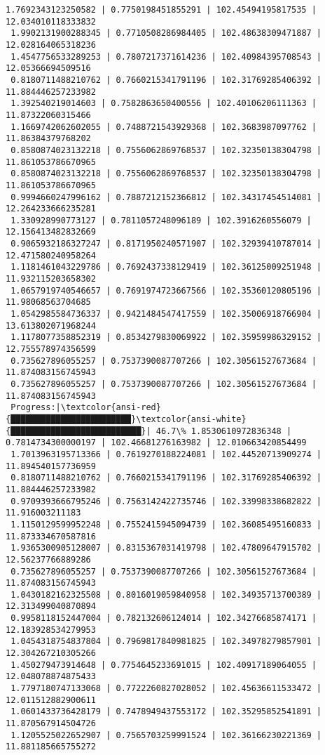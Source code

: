 \documentclass[11pt]{article}
\begin{document}
\begin{Verbatim}[commandchars=\\\{\}]
 1.7692343123250582 | 0.7750198451855291 | 102.45494195817535 | 12.034010118333832
 1.9902131900288345 | 0.7710508286984405 | 102.48638309471887 | 12.028164065318236
 1.4547756533289253 | 0.7807217371614236 | 102.40984395708543 | 12.05366694509516
 0.8180711488210762 | 0.7660215341791196 | 102.31769285406392 | 11.884446257233982
 1.392540219014603 | 0.7582863650400556 | 102.40106206111363 | 11.87322060315466
 1.1669742062602055 | 0.7488721543929368 | 102.3683987097762 | 11.86384379768202
 0.8580874023132218 | 0.7556062869768537 | 102.32350138304798 | 11.861053786670965
 0.8580874023132218 | 0.7556062869768537 | 102.32350138304798 | 11.861053786670965
 0.9994660247996162 | 0.7887212152366812 | 102.34317454514081 | 12.264233666235281
 1.330928990773127 | 0.7811057248096189 | 102.3916260556079 | 12.156413482832669
 0.9065932186327247 | 0.8171950240571907 | 102.32939410787014 | 12.471580240958264
 1.1181461043229786 | 0.7692437338129419 | 102.36125009251948 | 11.932115203658302
 1.0657919740546657 | 0.7691974723667566 | 102.35360120805196 | 11.98068563704685
 1.0542985584736337 | 0.9421484547417559 | 102.35006918766904 | 13.613802071968244
 1.1178077358852319 | 0.8534279830069922 | 102.35959986329152 | 12.755578974356599
 0.735627896055257 | 0.7537390087707266 | 102.30561527673684 | 11.874083156745943
 0.735627896055257 | 0.7537390087707266 | 102.30561527673684 | 11.874083156745943
 Progress:|\textcolor{ansi-red}{████████████████████████}\textcolor{ansi-white}{██████████████████████████}| 46.7\% 1.8530610972836348 | 0.7814734300000197 | 102.46681276163982 | 12.010663420854499
 1.7013963195713366 | 0.7619270188224081 | 102.44520713909274 | 11.894540157736959
 0.8180711488210762 | 0.7660215341791196 | 102.31769285406392 | 11.884446257233982
 0.9709393666795246 | 0.7563142422735746 | 102.33998338682822 | 11.916003211183
 1.1150129599952248 | 0.7552415945094739 | 102.36085495160833 | 11.873334670587816
 1.9365300905128007 | 0.8315367031419798 | 102.47809647915702 | 12.56237766889286
 0.735627896055257 | 0.7537390087707266 | 102.30561527673684 | 11.874083156745943
 1.0430182162325508 | 0.8016019059840958 | 102.34935713700389 | 12.313499040870894
 0.9958118152447004 | 0.782132606124014 | 102.34276685874171 | 12.183928534279953
 1.0454318754837804 | 0.7969817840981825 | 102.34978279857901 | 12.304267210305266
 1.450279473914648 | 0.7754645233691015 | 102.40917189064055 | 12.048078874875433
 1.7797180747133068 | 0.7722260827028052 | 102.45636611533472 | 12.011512882900611
 1.0601433736428179 | 0.7478949437553172 | 102.35295852541891 | 11.870567914504726
 1.1205525022652907 | 0.7565703259991524 | 102.36166230221369 | 11.881185665755272

\end{Verbatim}
\end{document}
